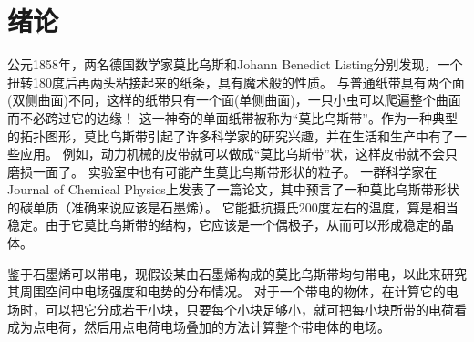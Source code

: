 
\chapter{绪论}
公元1858年，两名德国数学家莫比乌斯和Johann Benedict Listing分别发现，一个扭转180度后再两头粘接起来的纸条，具有魔术般的性质。
与普通纸带具有两个面(双侧曲面)不同，这样的纸带只有一个面(单侧曲面)，一只小虫可以爬遍整个曲面而不必跨过它的边缘！
这一神奇的单面纸带被称为“莫比乌斯带”。作为一种典型的拓扑图形，莫比乌斯带引起了许多科学家的研究兴趣，并在生活和生产中有了一些应用。
例如，动力机械的皮带就可以做成“莫比乌斯带”状，这样皮带就不会只磨损一面了。
\cite{ref0}
实验室中也有可能产生莫比乌斯带形状的粒子。
一群科学家在Journal of Chemical Physics上发表了一篇论文，其中预言了一种莫比乌斯带形状的碳单质（准确来说应该是石墨烯）。
它能抵抗摄氏200度左右的温度，算是相当稳定。由于它莫比乌斯带的结构，它应该是一个偶极子，从而可以形成稳定的晶体。
\cite{ref00}

鉴于石墨烯可以带电，现假设某由石墨烯构成的莫比乌斯带均匀带电，以此来研究其周围空间中电场强度和电势的分布情况。
对于一个带电的物体，在计算它的电场时，可以把它分成若干小块，只要每个小块足够小，就可把每小块所带的电荷看成为点电荷，然后用点电荷电场叠加的方法计算整个带电体的电场。
\cite{ref01}